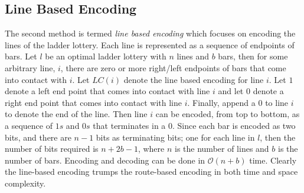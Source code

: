 \subsection{Line Based Encoding}
The second method is termed \emph{line based encoding} which focuses 
on encoding the lines of the ladder lottery. Each line is represented 
as a sequence of endpoints of bars. Let $l$ be an optimal ladder lottery 
with $n$ lines and $b$ bars, then for some arbitrary line, $i$, there 
are zero or more right/left endpoints of bars that 
come into contact with $i$. Let $LC(i)$ denote the line based encoding for line $i$.
Let $1$ denote a left end point that 
comes into contact with line $i$ and let $0$ denote a right 
end point that comes into contact with line $i$. Finally, append a $0$
to line $i$ to denote the end of the line. Then line $i$ can be 
encoded, from top to bottom, as a sequence of $1s$ and $0s$ that 
terminates in a $0$.  
Since each bar is encoded as two bits, and there are $n-1$ bits as terminating bits; 
one for each line in $l$, then the number of bits required is $n + 2b -1$, where $n$
is the number of lines and $b$ is the number of bars. Encoding and decoding can be 
done in $\mathcal{O}(n+b)$ time. Clearly the line-based encoding 
trumps the route-based encoding in both time and space complexity.

